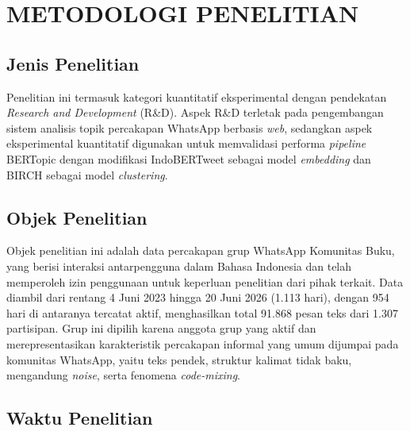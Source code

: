 %

\chapter{METODOLOGI PENELITIAN}

\section{Jenis Penelitian}
\label{sec:method-type}

Penelitian ini termasuk kategori kuantitatif eksperimental dengan pendekatan \textit{Research and Development} (R\&D).
Aspek R\&D terletak pada pengembangan sistem analisis topik percakapan WhatsApp berbasis \textit{web},
sedangkan aspek eksperimental kuantitatif digunakan untuk memvalidasi performa \textit{pipeline} BERTopic dengan modifikasi IndoBERTweet sebagai model \textit{embedding} dan BIRCH sebagai model \textit{clustering}.

\section{Objek Penelitian}
\label{sec:method-object}

Objek penelitian ini adalah data percakapan grup WhatsApp Komunitas Buku, yang berisi interaksi antarpengguna dalam Bahasa Indonesia dan telah memperoleh izin penggunaan untuk keperluan penelitian dari pihak terkait.
Data diambil dari rentang 4 Juni 2023 hingga 20 Juni 2026 (1.113 hari), dengan 954 hari di antaranya tercatat aktif, menghasilkan total 91.868 pesan teks dari 1.307 partisipan.
Grup ini dipilih karena anggota grup yang aktif dan merepresentasikan karakteristik percakapan informal yang umum dijumpai pada komunitas WhatsApp, yaitu teks pendek, struktur kalimat tidak baku, mengandung \textit{noise}, serta fenomena \textit{code-mixing}.

\section{Waktu Penelitian}
\label{sec:time}

